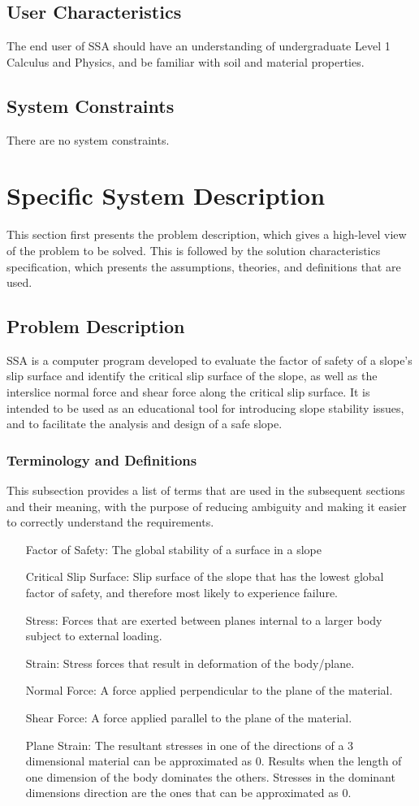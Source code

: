 \documentclass[12pt]{article}
\begin{document}
\subsection{User Characteristics}
\label{Sec:UserChars}
The end user of SSA should have an understanding of undergraduate Level 1 Calculus and Physics, and be familiar with soil and material properties.
\subsection{System Constraints}
\label{Sec:SysConstraints}
There are no system constraints.
\section{Specific System Description}
\label{Sec:SpecSystDesc}
This section first presents the problem description, which gives a high-level view of the problem to be solved. This is followed by the solution characteristics specification, which presents the assumptions, theories, and definitions that are used.
\subsection{Problem Description}
\label{Sec:ProbDesc}
SSA is a computer program developed to evaluate the factor of safety of a slope's slip surface and identify the critical slip surface of the slope, as well as the interslice normal force and shear force along the critical slip surface. It is intended to be used as an educational tool for introducing slope stability issues, and to facilitate the analysis and design of a safe slope.
\subsubsection{Terminology and Definitions}
\label{Sec:TermDefs}
This subsection provides a list of terms that are used in the subsequent sections and their meaning, with the purpose of reducing ambiguity and making it easier to correctly understand the requirements.
\begin{itemize}
\item[Factor of Safety:]The global stability of a surface in a slope
\item[Critical Slip Surface:]Slip surface of the slope that has the lowest global factor of safety, and therefore most likely to experience failure.
\item[Stress:]Forces that are exerted between planes internal to a larger body subject to external loading.
\item[Strain:]Stress forces that result in deformation of the body/plane.
\item[Normal Force:]A force applied perpendicular to the plane of the material.
\item[Shear Force:]A force applied parallel to the plane of the material.
\item[Plane Strain:]The resultant stresses in one of the directions of a 3 dimensional material can be approximated as 0. Results when the length of one dimension of the body dominates the others. Stresses in the dominant dimensions direction are the ones that can be approximated as 0.
\end{itemize}
\end{document}
